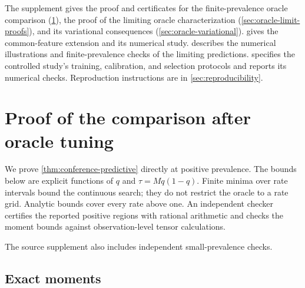 \documentclass{alt2027}
\begin{document}
The supplement gives the proof and certificates for the finite-prevalence oracle
comparison (\cref{sec:predictive-proofs}), the proof of the limiting oracle
characterization (\cref{sec:oracle-limit-proofs}), and its variational
consequences (\cref{sec:oracle-variational}). 
gives the common-feature extension and its numerical study.
 describes the numerical illustrations and
finite-prevalence checks of the limiting predictions.
 specifies the controlled study's training,
calibration, and selection protocols and reports its numerical checks.
Reproduction instructions are in \cref{sec:reproducibility}.

\section{Proof of the comparison after oracle tuning}
\label{sec:predictive-proofs}

We prove \cref{thm:conference-predictive} directly at positive prevalence. The
bounds below are explicit functions of $q$ and $\tau = Mq(1 - q)$. Finite minima
over rate intervals bound the continuous search; they do not restrict the oracle
to a rate grid. Analytic bounds cover every rate above one. An independent
checker certifies the reported positive regions with rational arithmetic and
checks the moment bounds against observation-level tensor calculations.

The source supplement also includes independent small-prevalence checks.

\subsection{Exact moments}
\end{document}
